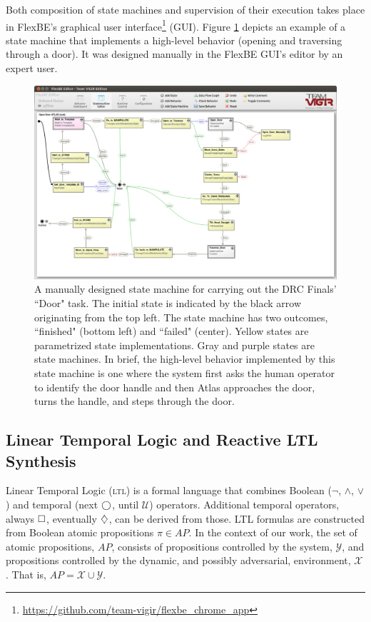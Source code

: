 Both composition of state machines and supervision of their execution takes place in FlexBE's graphical user interface\footnote{\scriptsize{\url{https://github.com/team-vigir/flexbe_chrome_app}}} (GUI).
Figure \ref{Fig:FlexBESM} depicts an example of a state machine that implements a high-level behavior (opening and traversing through a door).
It was designed manually in the FlexBE GUI's editor by an expert user.

\begin{figure}[t]
\centering
\includegraphics[width=0.99\columnwidth,clip]{./img/behavior_open_door.png}
\caption{A manually designed state machine for carrying out the DRC Finals' ``Door" task.
The initial state is indicated by the black arrow originating from the top left.
The state machine has two outcomes, ``finished" (bottom left) and ``failed" (center).
Yellow states are parametrized state implementations.
Gray and purple states are state machines.
In brief, the high-level behavior implemented by this state machine is one where the system first asks the human operator to identify the door handle and then Atlas approaches the door, turns the handle, and steps through the door.
}
\label{Fig:FlexBESM}
\end{figure}

\subsection{Linear Temporal Logic and Reactive LTL Synthesis}\label{S:GR1}

Linear Temporal Logic (\textsc{ltl}) is a formal language that combines Boolean ($\lnot$, $\wedge$, $\lor$) and temporal (next $\operatorname{\bigcirc}$, until $\mathcal{U}$) operators.
Additional temporal operators, always $\operatorname{\Box}$, eventually $\operatorname{\diamondsuit}$, can be derived from those.
\textsc{LTL} formulas are constructed from Boolean atomic propositions $\pi \in AP$.
In the context of our work, the set of atomic propositions, $AP$, consists of propositions controlled by the system, $\mathcal{Y}$, and propositions controlled by the dynamic, and possibly adversarial, environment, $\mathcal{X}$. That is, $AP = \mathcal{X} \cup \mathcal{Y}$.


